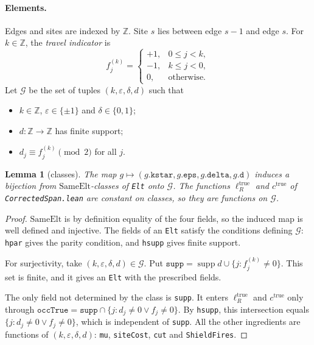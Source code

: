 \documentclass[11pt]{article}
\theoremstyle{plain}
\newtheorem{lemma}[theorem]{Lemma}
\theoremstyle{definition}
\theoremstyle{remark}
\begin{document}
\paragraph{Elements.}
Edges and sites are indexed by $\mathbb Z$. Site $s$ lies between edge $s-1$ and edge $s$.
For $k\in\mathbb Z$, the \emph{travel indicator} is
\[
  f^{(k)}_j=\begin{cases}+1,&0\le j<k,\\-1,&k\le j<0,\\0,&\text{otherwise.}\end{cases}
\]
Let $\mathcal G$ be the set of tuples $(k,\varepsilon,\delta,d)$ such that
\begin{itemize}
\item $k\in\mathbb Z$, $\varepsilon\in\{\pm1\}$ and $\delta\in\{0,1\}$;
\item $d:\mathbb Z\to\mathbb Z$ has finite support;
\item $d_j\equiv f^{(k)}_j\pmod 2$ for all $j$.
\end{itemize}

\begin{lemma}[classes]\label{M3:lem:classes}
The map $g\mapsto(g.\mathtt{kstar},g.\mathtt{eps},g.\mathtt{delta},g.\mathtt d)$ induces a
bijection from $\mathrm{SameElt}$-classes of \texttt{Elt} onto $\mathcal G$. The functions
$\ell_R^{\mathrm{true}}$ and $c^{\mathrm{true}}$ of \texttt{CorrectedSpan.lean} are
constant on classes, so they are functions on $\mathcal G$.
\end{lemma}

\begin{proof}
$\mathrm{SameElt}$ is by definition equality of the four fields, so the induced map is well
defined and injective. The fields of an \texttt{Elt} satisfy the conditions defining
$\mathcal G$: \texttt{hpar} gives the parity condition, and \texttt{hsupp} gives finite support.

For surjectivity, take $(k,\varepsilon,\delta,d)\in\mathcal G$. Put
$\mathtt{supp}=\operatorname{supp}d\cup\{j:f^{(k)}_j\ne0\}$. This set is finite, and it gives an
\texttt{Elt} with the prescribed fields.

The only field not determined by the class is \texttt{supp}. It enters
$\ell_R^{\mathrm{true}}$ and $c^{\mathrm{true}}$ only through
$\mathtt{occTrue}=\mathtt{supp}\cap\{j:d_j\ne0\vee f_j\ne0\}$. By \texttt{hsupp}, this
intersection equals $\{j:d_j\ne0\vee f_j\ne0\}$, which is independent of \texttt{supp}. All
the other ingredients are functions of $(k,\varepsilon,\delta,d)$:
\texttt{mu}, \texttt{siteCost}, \texttt{cut} and \texttt{ShieldFires}.
\end{proof}
\end{document}
